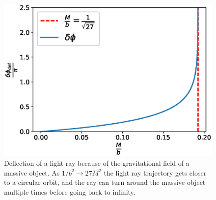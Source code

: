 \begin{figure}[h]
    \centering
    \includegraphics[width = 0.65 \textwidth]{Figures/chapter1/deflection_w.eps}
    \caption{Deflection of a light ray because of the gravitational field of a
    massive object.
    As $1 / b^2 \rightarrow 27 M^2$ the light ray trajectory gets closer to a
    circular orbit, and the ray can turn around the massive object multiple
    times before going back to infinity.}
    \label{cap1:fig:deflection_w}
\end{figure}


